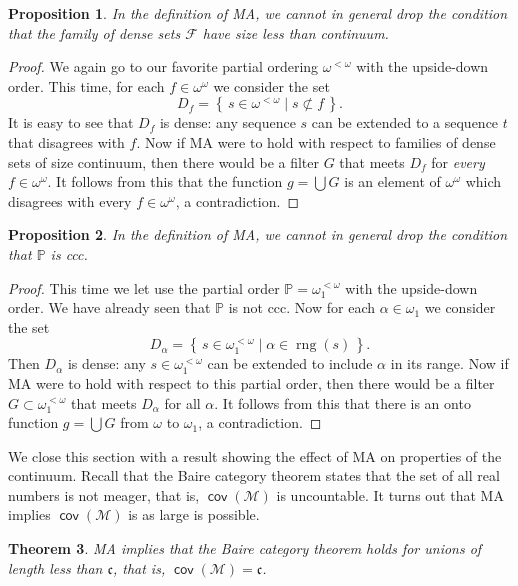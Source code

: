 \documentclass[11pt,oneside]{amsbook}
\newcommand{\set}[1]{\left\{\,#1\,\right\}}
\newcommand{\PP}{\mathbb P}
\newcommand{\Meager}{\mathcal M}
\DeclareMathOperator{\rng}{rng}
\DeclareMathOperator{\cov}{\mathsf{cov}}
\theoremstyle{definition}
\theoremstyle{plain}
\newtheorem{thm}{Theorem}[section]
\newtheorem{prop}[thm]{Proposition}
\theoremstyle{definition}
\theoremstyle{remark}
\numberwithin{equation}{section}
\numberwithin{figure}{section}
\begin{document}
\begin{prop}
  In the definition of MA, we cannot in general drop the condition that the family of dense sets $\mathcal F$ have size less than continuum.
\end{prop}

\begin{proof}
  We again go to our favorite partial ordering $\omega^{<\omega}$ with the upside-down order. This time, for each $f\in\omega^\omega$ we consider the set
  \[D_f=\set{s\in\omega^{<\omega}\mid s\not\subset f}\text{.}
  \]
  It is easy to see that $D_f$ is dense: any sequence $s$ can be extended to a sequence $t$ that disagrees with $f$. Now if MA were to hold with respect to families of dense sets of size continuum, then there would be a filter $G$ that meets $D_f$ for \emph{every} $f\in\omega^\omega$. It follows from this that the function $g=\bigcup G$ is an element of $\omega^\omega$ which disagrees with every $f\in\omega^\omega$, a contradiction.
\end{proof}

\begin{prop}
  In the definition of MA, we cannot in general drop the condition that $\PP$ is ccc.
\end{prop}

\begin{proof}
  This time we let use the partial order $\PP=\omega_1^{<\omega}$ with the upside-down order. We have already seen that $\PP$ is not ccc. Now for each $\alpha\in\omega_1$ we consider the set
  \[D_\alpha=\set{s\in\omega_1^{<\omega}\mid\alpha\in\rng(s)}\text{.}
  \]
  Then $D_\alpha$ is dense: any $s\in\omega_1^{<\omega}$ can be extended to include $\alpha$ in its range. Now if MA were to hold with respect to this partial order, then there would be a filter $G\subset\omega_1^{<\omega}$ that meets $D_\alpha$ for all $\alpha$. It follows from this that there is an onto function $g=\bigcup G$ from $\omega$ to $\omega_1$, a contradiction.
\end{proof}

We close this section with a result showing the effect of MA on properties of the continuum. Recall that the Baire category theorem states that the set of all real numbers is not meager, that is, $\cov(\Meager)$ is uncountable. It turns out that MA implies $\cov(\Meager)$ is as large is possible.

\begin{thm}
  \label{thm:ma-covm}
  MA implies that the Baire category theorem holds for unions of length less than $\mathfrak c$, that is, $\cov(\Meager)=\mathfrak c$.
\end{thm}
\end{document}
